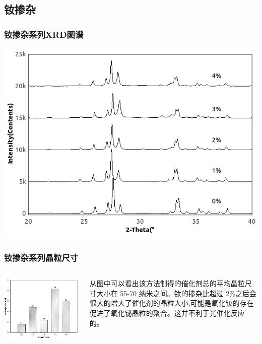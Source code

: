 \documentclass[xetex,compress]{mybeamer}
\begin{document}
\subsection{钕掺杂}
\begin{frame}
\frametitle{钕掺杂系列XRD图谱}
\begin{block}{}
\centering
\includegraphics[scale=7]{figures/钕掺杂XRD.jpg} 
\end{block}
\end{frame}

\begin{frame}
\frametitle{钕掺杂系列晶粒尺寸}
\begin{columns}
\begin{block}{}
\centering
\includegraphics[width=\linewidth]{figures/钕掺杂粒径大小.jpg} 
\end{block}
\begin{block}{}
从图中可以看出该方法制得的催化剂总的平均晶粒尺寸大小在 55-70 纳米之间。钕的掺杂比超过 2\%之后会很大的增大了催化剂的晶粒大小,可能是氧化钕的存在促进了氧化铋晶粒的聚合。这并不利于光催化反应的。
\end{block}
\end{columns}
\end{frame}
\end{document}
